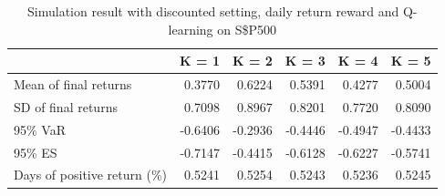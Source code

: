 \documentclass{article}
\begin{document}
\begin{table}[H]
\centering
\begin{tabular}{|l|r|r|r|r|r|} 
\hline
                             & \multicolumn{1}{l|}{K = 1} & \multicolumn{1}{l|}{K = 2} & \multicolumn{1}{l|}{K = 3} & \multicolumn{1}{l|}{K = 4} & \multicolumn{1}{l|}{K = 5}  \\ 
\hline
Mean of final returns        & 0.3770                     & 0.6224                     & 0.5391                     & 0.4277                     & 0.5004                      \\ 
\hline
SD of final returns          & 0.7098                     & 0.8967                     & 0.8201                     & 0.7720                     & 0.8090                      \\ 
\hline
95\% VaR                     & -0.6406                    & -0.2936                    & -0.4446                    & -0.4947                    & -0.4433                     \\ 
\hline
95\% ES                      & -0.7147                    & -0.4415                    & -0.6128                    & -0.6227                    & -0.5741                     \\ 
\hline
Days of positive return (\%) & 0.5241                     & 0.5254                     & 0.5243                     & 0.5236                     & 0.5245                      \\
\hline
\end{tabular}
\caption{Simulation result with discounted setting, daily return reward and Q-learning on S\$P500}
\label{table18}
\end{table}
\end{document}
